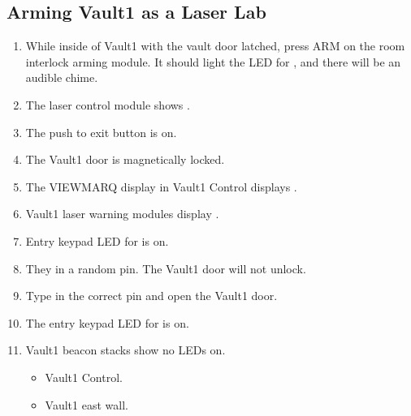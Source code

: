 \documentclass[letterpaper,10pt,english]{sphinxmanual}
\begin{document}
\subsection{Arming Vault\sphinxhyphen{}1 as a Laser Lab}
\label{\detokenize{testing_documentation/Vault-1_laser:arming-vault-1-as-a-laser-lab}}\begin{enumerate}
%
\item {} 
\sphinxAtStartPar
While inside of Vault\sphinxhyphen{}1 with the vault door latched, press ARM on the room interlock arming module.
It should light the LED for , and there will be an audible chime.

\item {} 
\sphinxAtStartPar
The laser control module shows .

\item {} 
\sphinxAtStartPar
The push to exit button is on.

\item {} 
\sphinxAtStartPar
The Vault\sphinxhyphen{}1 door is magnetically locked.

\item {} 
\sphinxAtStartPar
The VIEWMARQ display in Vault\sphinxhyphen{}1 Control displays .

\item {} 
\sphinxAtStartPar
Vault\sphinxhyphen{}1 laser warning modules display .

\item {} 
\sphinxAtStartPar
Entry keypad LED for  is on.

\item {} 
\sphinxAtStartPar
They in a random pin.
The Vault\sphinxhyphen{}1 door will not unlock.

\item {} 
\sphinxAtStartPar
Type in the correct pin and open the Vault\sphinxhyphen{}1 door.

\item {} 
\sphinxAtStartPar
The entry keypad LED for  is on.

\item {} 
\sphinxAtStartPar
Vault\sphinxhyphen{}1 beacon stacks show no LEDs on.
\begin{itemize}
\item {} 
\sphinxAtStartPar
Vault\sphinxhyphen{}1 Control.

\item {} 
\sphinxAtStartPar
Vault\sphinxhyphen{}1 east wall.


\end{itemize}
\end{enumerate}
\end{document}
